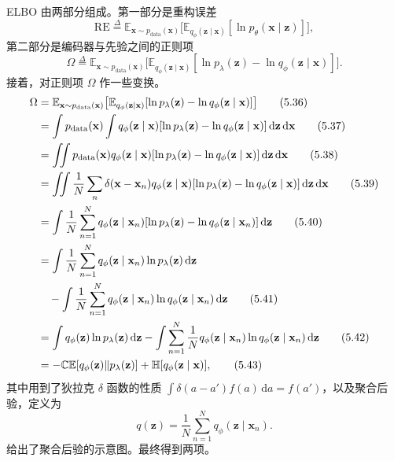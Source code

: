 ELBO 由两部分组成。第一部分是重构误差
\begin{equation}
\mathrm{RE}\stackrel{\Delta}{=}\mathbb{E}_{\mathbf{x}\sim p_{\mathrm{data}}(\mathbf{x})}
 \bigl[\mathbb{E}_{q_\phi(\mathbf{z}\mid\mathbf{x})}[\ln p_\theta(\mathbf{x}\mid\mathbf{z})]\bigr],
\tag{5.34}\label{eq:05-34}
\end{equation}
第二部分是编码器与先验之间的正则项
\begin{equation}
\Omega\stackrel{\Delta}{=}\mathbb{E}_{\mathbf{x}\sim p_{\mathrm{data}}(\mathbf{x})}
 \bigl[\mathbb{E}_{q_\phi(\mathbf{z}\mid\mathbf{x})}[\ln p_\lambda(\mathbf{z})-\ln q_\phi(\mathbf{z}\mid\mathbf{x})]\bigr].
\tag{5.35}\label{eq:05-35}
\end{equation}
接着，对正则项 $\Omega$ 作一些变换。
\begin{align}
\Omega &= \mathbb{E}_{\mathbf{x}\sim p_{\mathrm{data}}(\mathbf{x})}
 \bigl[\mathbb{E}_{q_\phi(\mathbf{z}\mid\mathbf{x})}[\ln p_\lambda(\mathbf{z})-\ln q_\phi(\mathbf{z}\mid\mathbf{x})]\bigr]
 \tag{5.36}\label{eq:05-36}\\
 &= \int p_{\mathrm{data}}(\mathbf{x})\int q_\phi(\mathbf{z}\mid\mathbf{x})
 [\ln p_\lambda(\mathbf{z})-\ln q_\phi(\mathbf{z}\mid\mathbf{x})]\,\mathrm{d}\mathbf{z}\,\mathrm{d}\mathbf{x}
 \tag{5.37}\label{eq:05-37}\\
 &= \iint p_{\mathrm{data}}(\mathbf{x})q_\phi(\mathbf{z}\mid\mathbf{x})
 [\ln p_\lambda(\mathbf{z})-\ln q_\phi(\mathbf{z}\mid\mathbf{x})]\,\mathrm{d}\mathbf{z}\,\mathrm{d}\mathbf{x}
 \tag{5.38}\label{eq:05-38}\\
 &= \iint\frac{1}{N}\sum_n\delta(\mathbf{x}-\mathbf{x}_n)q_\phi(\mathbf{z}\mid\mathbf{x})
 [\ln p_\lambda(\mathbf{z})-\ln q_\phi(\mathbf{z}\mid\mathbf{x})]\,\mathrm{d}\mathbf{z}\,\mathrm{d}\mathbf{x}
 \tag{5.39}\label{eq:05-39}\\
 &= \int\frac{1}{N}\sum_{n=1}^N q_\phi(\mathbf{z}\mid\mathbf{x}_n)
 [\ln p_\lambda(\mathbf{z})-\ln q_\phi(\mathbf{z}\mid\mathbf{x}_n)]\,\mathrm{d}\mathbf{z}
 \tag{5.40}\label{eq:05-40}\\
 &= \int\frac{1}{N}\sum_{n=1}^N q_\phi(\mathbf{z}\mid\mathbf{x}_n)\ln p_\lambda(\mathbf{z})\,\mathrm{d}\mathbf{z}
 \notag\\
 &\quad-\int\frac{1}{N}\sum_{n=1}^N q_\phi(\mathbf{z}\mid\mathbf{x}_n)\ln q_\phi(\mathbf{z}\mid\mathbf{x}_n)\,\mathrm{d}\mathbf{z}
 \tag{5.41}\label{eq:05-41}\\
 &= \int q_\phi(\mathbf{z})\ln p_\lambda(\mathbf{z})\,\mathrm{d}\mathbf{z}-
 \int\sum_{n=1}^N\frac{1}{N}q_\phi(\mathbf{z}\mid\mathbf{x}_n)\ln q_\phi(\mathbf{z}\mid\mathbf{x}_n)\,\mathrm{d}\mathbf{z}
 \tag{5.42}\label{eq:05-42}\\
 &= -\mathbb{CE}[q_\phi(\mathbf{z})\|p_\lambda(\mathbf{z})]
       +\mathbb{H}[q_\phi(\mathbf{z}\mid\mathbf{x})], \tag{5.43}\label{eq:05-43}
\end{align}
其中用到了狄拉克 $\delta$ 函数的性质 $\int\delta(a-a')f(a)\,\mathrm{d}a=f(a')$，以及聚合后验，定义为
\begin{equation}
q(\mathbf{z})=\frac{1}{N}\sum_{n=1}^N q_\phi(\mathbf{z}\mid\mathbf{x}_n).
\tag{5.44}\label{eq:05-44}
\end{equation}
给出了聚合后验的示意图。最终得到两项。

